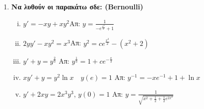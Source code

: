 \begin{enumerate}
  \item {\bfseries Να λυθούν οι παρακάτω σδε: \textlatin{(Bernoulli)}}
    \begin{enumerate}[i)]
      \item $y'=-xy+xy^2$\hfill Απ: $y=\frac{1}{-e^{\frac{x^2}{2}}+1}$
      \item $2yy'-xy^2=x^3$\hfill Απ: $y^2=ce^{\frac{x^2}{2}}-(x^2+2)$
      \item $y'+y=y^{\frac{2}{3}}$ \hfill Απ: $y^{\frac{1}{3}}=1+ce^{-\frac{x}{3}}$
      \item $xy'+y=y^{2}\ln x \quad y(e)=1$ \hfill Απ: $y^{-1}=-xe^{-1}+1+\ln x$
      \item $ y'+2xy=2x^{3}y^{3} $, \quad $ y(0)=1 $ 
        \hfill Απ: $ y=\frac{1}{\sqrt{x^{2}+ \frac{1}{2}+\frac{1}{2} e^{2x^{2}}}} $ 
    \end{enumerate}




\end{enumerate}
